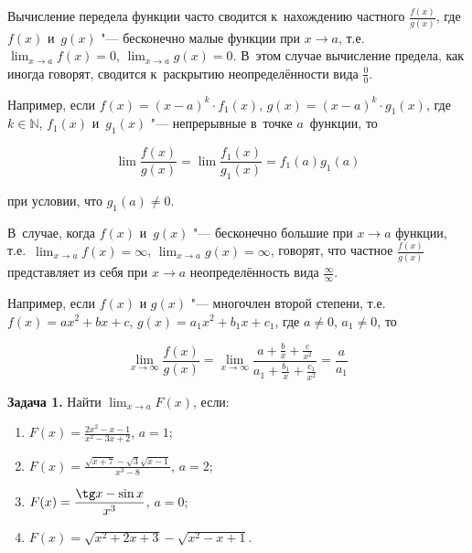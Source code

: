 
Вычисление передела функции часто сводится к~нахождению частного
$\displaystyle \frac{f(x)}{g(x)}$, где $f(x)$ и~$g(x)$ "--- бесконечно малые функции
при $x \to a$, т.е.\ $\displaystyle \lim_{x \to a} f(x) = 0$,
$\displaystyle \lim_{x \to a} g(x) = 0$.
В~этом случае вычисление предела, как иногда говорят, сводится к~раскрытию
неопределённости вида $\displaystyle \frac{0}{0}$.

Например, если $f(x) = (x - a)^{k} \cdot f_{1}(x)$,
$g(x) = (x - a)^{k} \cdot g_{1}(x)$, где $k \in \mathbb{N}$,
$f_{1}(x)$ и~$g_{1}(x)$ "--- непрерывные в~точке $a$~функции, то

\begin{equation*}
\displaystyle \lim \frac{f(x)}{g(x)} = \lim \frac{f_{1}(x)}{g_{1}(x)} = {f_{1}(a)}{g_{1}(a)}
\end{equation*}

при условии, что $g_{1}(a) \ne 0$.

В~случае, когда $f(x)$ и~$g(x)$ "--- бесконечно большие при $x \to a$ функции,
т.е.\ $\displaystyle \lim_{x \to a} f(x) = \infty$,
$\displaystyle \lim_{x \to a} g(x) = \infty$, говорят, что частное 
$\displaystyle \frac{f(x)}{g(x)}$ представляет из себя при $x \to a$
неопределённость вида $\displaystyle \frac{\infty}{\infty}$.

Например, если $f(x)$ и $g(x)$ "--- многочлен второй степени,
т.е.\ $f(x) = ax^{2} + bx + c$, $g(x) = a_{1}x^{2} + b_{1}x + c_{1}$,
где $a \ne 0$, $a_{1} \ne 0$, то

\begin{equation*}
\displaystyle \lim_{x \to \infty} \frac{f(x)}{g(x)} = 
\lim_{x \to \infty}
\frac
{a + \frac{b}{x} + \frac{c}{x^{2}}}
{a_{1} + \frac{b_{1}}{x} + \frac{c_{1}}{x^{2}}} = 
\frac{a}{a_{1}}
\end{equation*}

\textbf{Задача 1.}\label{ex:4_4_1_1} Найти $\displaystyle \lim_{x \to a} F(x)$, если:

\begin{enumerate} 
\item $\displaystyle F(x) = \frac{2x^{2} - x - 1}{x^{2} - 3x + 2}$, $a = 1$;
\item $\displaystyle F(x) = \frac{\sqrt{x + 7} - \sqrt{3}\sqrt{x - 1}}{x^{3} - 8}$, $a = 2$;
\item $\displaystyle F(x) = \frac{\tg x - \sin x}{x^{3}}$, $a = 0$;
\item $\displaystyle F(x) = \sqrt{x^{2} + 2x + 3} - \sqrt{x^{2} - x + 1}$.
\end{enumerate}

